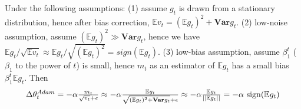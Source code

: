 \documentclass{article}
\begin{document}
Under the following assumptions: (1) assume $g_t$ is drawn from a stationary distribution, hence after bias correction, $\mathbb{E} v_t= (\mathbb{E} g_t )^2 + \mathbf{Var} g_t$. (2) low-noise assumption, assume $(\mathbb{E} g_t)^2 \gg \mathbf{Var} g_t$, hence we have $\mathbb{E}g_t / \sqrt{ \mathbb{E} v_t } 
\approx \mathbb{E} g_t / \sqrt{(\mathbb{E} g_t)^2} = sign( \mathbb{E} g_t)$. (3) low-bias assumption, assume $\beta_1^t$ ($\beta_1$ to the power of $t$) is small, hence $m_t$ as an estimator of $\mathbb{E}g_t$ has a small bias $\beta_1^t \mathbb{E} g_t$. 
Then
\begin{equation}
\label{eq:adam_update}
\scalebox{1.0}{
$
    \Delta \theta_t^{Adam} = - \alpha \frac{m_t}{\sqrt{v_t} + \epsilon} \approx - \alpha \frac{\mathbb{E} g_t}{ \sqrt{(\mathbb{E}g_t)^2 + \mathbf{Var} g_t } + \epsilon} \approx - \alpha \frac{\mathbb{E} g_t}{ \vert \vert \mathbb{E}g_t \vert \vert } = - \alpha \  \mathrm{sign}( \mathbb{E} g_t )
    $
    }
\end{equation}


\end{document}
